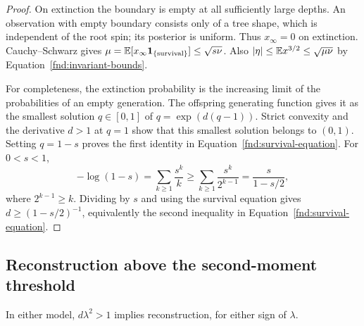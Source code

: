 \begin{proof}
On extinction the boundary is empty at all sufficiently large depths.
An observation with empty boundary consists only of a tree shape, which
is independent of the root spin; its posterior is uniform.  Thus
\(x_\infty=0\) on extinction.  Cauchy--Schwarz gives
\(\mu=\mathbb E[x_\infty\mathbf1_{\{\mathrm{survival}\}}]
\leq\sqrt{s\nu}\).  Also
\(|\eta|\leq\mathbb E x^{3/2}\leq\sqrt{\mu\nu}\) by
Equation~\eqref{fnd:invariant-bounds}.

For completeness, the extinction probability is the increasing limit
of the probabilities of an empty generation.  The offspring generating
function gives it as the smallest solution \(q\in[0,1]\) of
\(q=\exp(d(q-1))\).  Strict convexity and the derivative \(d>1\)
at \(q=1\) show that this smallest solution belongs to \((0,1)\).
Setting \(q=1-s\) proves the first identity in
Equation~\eqref{fnd:survival-equation}.  For \(0<s<1\),
\[
 -\log(1-s)=\sum_{k\geq1}\frac{s^k}{k}
 \geq\sum_{k\geq1}\frac{s^k}{2^{k-1}}
 =\frac{s}{1-s/2},
\]
where \(2^{k-1}\geq k\).  Dividing by \(s\) and using the
survival equation gives \(d\geq(1-s/2)^{-1}\), equivalently the
second inequality in Equation~\eqref{fnd:survival-equation}.
\end{proof}

\subsection{Reconstruction above the second-moment threshold}

\begin{proposition}\label{fnd:supercritical}
In either model, \(d\lambda^2>1\) implies reconstruction, for either
sign of \(\lambda\).
\end{proposition}


